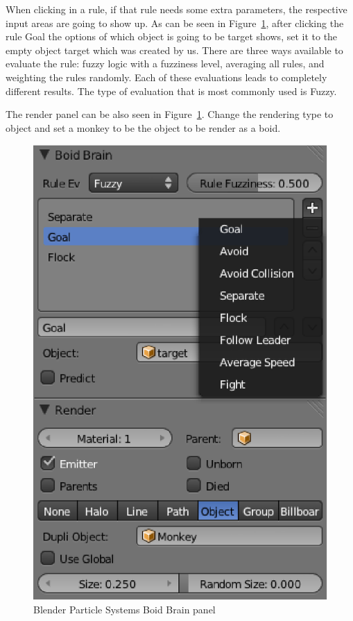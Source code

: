 When clicking in a rule, if that rule needs some extra parameters, the respective input areas are going to show up. As can be seen in Figure~\ref{boidsBrain}, after clicking the rule Goal the options of which object is going to be target shows, set it to the empty object target which was created by us. There are three ways available to evaluate the rule: fuzzy logic with a fuzziness level, averaging all rules, and weighting the rules randomly. Each of these evaluations leads to completely different results. The type of evaluation that is most commonly used is Fuzzy.

The render panel can be also seen in Figure~\ref{boidsBrain}. Change the rendering type to object and set a monkey to be the object to be render as a boid.

\begin{figure}[htbp]
\begin{center}
\includegraphics[scale = 0.5]{figures/boidsBrain.eps}
\caption{Blender Particle Systems Boid Brain panel}
\label{boidsBrain}
\end{center}
\end{figure}

